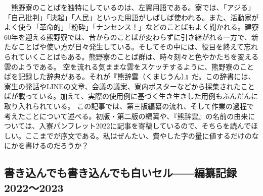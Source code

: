 　熊野寮のことばを独特にしているのは、左翼用語である。寮では、「アジる」「自己批判」「決起」「人民」といった用語がしばしば使われる。また、活動家がよく使う「革命的」「粉砕」「ナンセンス！」などのことばもよく聞かれる。建寮60年を迎える熊野寮では、昔からのことばが変わらずに引き継がれる一方で、新たなことばや使い方が日々発生している。そしてその中には、役目を終えて忘れられていくことばもある。熊野寮のことば群は、時々刻々と色やかたちを変える雲のようである。
空を流れる気ままな雲をスケッチするように、熊野寮のことばを記録した辞典がある。それが『熊辞雲（くまじうん）』だ。この辞書には、寮生の発話やLINEの文章、会議の議案、寮内ポスターなどから採集されたことばが載っている。加えて、実際の使用例に基づく生き生きした用例もふんだんに取り入れられている。
この記事では、第三版編纂の流れ、そして作業の過程で考えたことについて述べる。初版・第二版の編纂や、『熊辞雲』の名前の由来については、入寮パンフレット2022に記事を寄稿しているので、そちらを読んでほしい。ここまでが序文である。私はぜんたい、費やした字の量に値するだけのなにかを書けるのだろうか？


\subsection{書き込んでも書き込んでも白いセル――編纂記録2022～2023}



